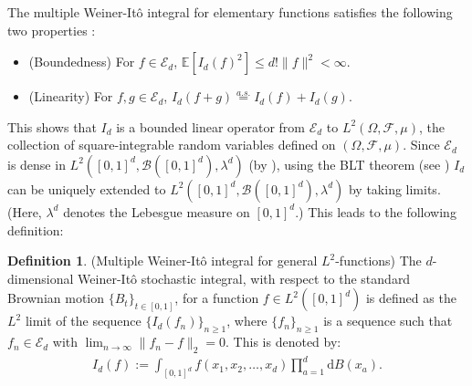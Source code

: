\documentclass[11pt,reqno]{amsart}
\numberwithin{equation}{section}
\newcommand{\E}{\mathbb{E}}
\newcommand{\cF}{{\mathcal F}}
\theoremstyle{definition}
\newtheorem{definition}{Definition}[section]
\begin{document}
The multiple Weiner-It\^{o} integral for elementary functions satisfies the following two properties \citep{stochasticintegral}: 

\begin{itemize}

\item (Boundedness) For $f \in  \mathcal{E}_d$, $\E[I_d(f)^2] \leq d! \|f\|^2 < \infty$.  

\item (Linearity) For $f,g\in \mathcal{E}_d$, 
$I_d(f+g) \stackrel{a.s.}{=} I_d(f)+I_d(g)$. 

\end{itemize}
This shows that $I_d$ is a bounded linear operator from $\mathcal{E}_d $ to $L^2(\Omega, \cF, \mu)$, the collection of square-integrable random variables defined on $(\Omega, \cF, \mu)$. Since $\mathcal{E}_d$ is dense in $L^2([0, 1]^d, \mathscr{B}([0, 1]^d), \lambda^d)$ (by \cite[Theorem 2.1]{stochasticintegral}), using the BLT theorem (see \cite[Theorem I.7]{reedsimon}) $I_d$ can be uniquely extended to $L^2([0, 1]^d, \mathscr{B}([0, 1]^d), \lambda^d)$ by taking limits. (Here, $ \lambda^d$ denotes the Lebesgue measure on $[0, 1]^d$.) This leads to the following definition: 

\begin{definition}\label{defn:integral_II} (Multiple Weiner-It\^{o} integral for general $L^{2}$-functions) The $d$-dimensional Weiner-It\^{o} stochastic integral, with respect to the standard Brownian motion $\{B_t\}_{t \in [0, 1]}$, for a function $f \in L^2([0, 1]^d)$ is defined as the $L^{2}$ limit of the sequence $\{I_d(f_n)\}_{n \geq 1}$,  where $\{f_n\}_{n \geq 1}$ is a sequence such that $f_n \in \mathcal{E}_d$ with $\lim_{n \rightarrow \infty}\|f_n-f\|_2 = 0$. 
This is denoted by:  
\begin{align}\label{eq:integral}
I_d(f):=\int_{[0, 1]^d} f(x_1, x_2, \ldots, x_d) \prod_{a=1}^d \mathrm d B(x_a). 
\end{align}
\end{definition}
\end{document}
